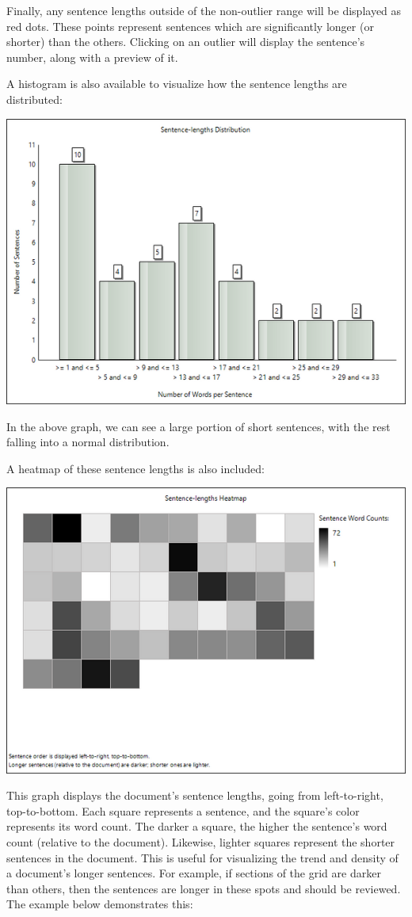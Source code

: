 \documentclass[
]{book}
\theoremstyle{definition}
\theoremstyle{definition}
\theoremstyle{definition}
\theoremstyle{definition}
\theoremstyle{remark}
\begin{document}
Finally, any sentence lengths outside of the non-outlier range will be displayed as red dots. These points represent sentences which are significantly longer (or shorter) than the others. Clicking on an outlier will display the sentence's number, along with a preview of it.

A histogram is also available to visualize how the sentence lengths are distributed:

\begin{center}\includegraphics[width=0.75\linewidth,]{Images/SentencesHistogram} \end{center}

In the above graph, we can see a large portion of short sentences, with the rest falling into a normal distribution.

A heatmap of these sentence lengths is also included:

\begin{center}\includegraphics[width=0.75\linewidth,]{Images/SentencesHeatmap} \end{center}

This graph displays the document's sentence lengths, going from left-to-right, top-to-bottom. Each square represents a sentence, and the square's color represents its word count. The darker a square, the higher the sentence's word count (relative to the document). Likewise, lighter squares represent the shorter sentences in the document. This is useful for visualizing the trend and density of a document's longer sentences. For example, if sections of the grid are darker than others, then the sentences are longer in these spots and should be reviewed. The example below demonstrates this:
\end{document}
